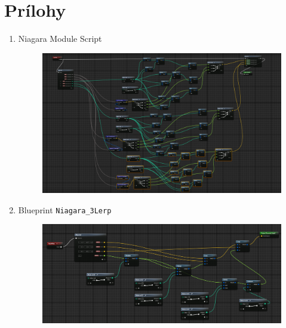 \cleardoublepage
{} 
{}
\section*{Prílohy}
\begin{enumerate}[leftmargin=*]
    \item Niagara Module Script \label{att:nms}
    \begin{figure}[!htbp]
        \centering
        \includegraphics[width=21cm,angle=90,origin=c]{img/nms.png}
    \end{figure}
    \newpage

    \item Blueprint \texttt{Niagara\_3Lerp} \label{att:lerp}
    \begin{figure}[!htbp]
        \centering
        \includegraphics[width=22cm,angle=90,origin=c]{img/3lerp.png}
    \end{figure}
    \newpage


\end{enumerate}
